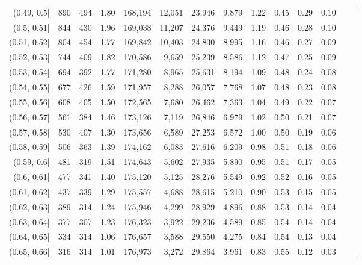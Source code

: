 \begin{tabular}{rrrrrrrrrrrrrr}
(0.49, 0.5]    &    890 &  494 &    1.80 &  168,194 &   12,051 &  23,946 &   9,879 &  1.22 &  0.45 &  0.29 &      0.10 \\
(0.5, 0.51]    &    844 &  430 &    1.96 &  169,038 &   11,207 &  24,376 &   9,449 &  1.19 &  0.46 &  0.28 &      0.10 \\
(0.51, 0.52]   &    804 &  454 &    1.77 &  169,842 &   10,403 &  24,830 &   8,995 &  1.16 &  0.46 &  0.27 &      0.09 \\
(0.52, 0.53]   &    744 &  409 &    1.82 &  170,586 &    9,659 &  25,239 &   8,586 &  1.12 &  0.47 &  0.25 &      0.09 \\
(0.53, 0.54]   &    694 &  392 &    1.77 &  171,280 &    8,965 &  25,631 &   8,194 &  1.09 &  0.48 &  0.24 &      0.08 \\
(0.54, 0.55]   &    677 &  426 &    1.59 &  171,957 &    8,288 &  26,057 &   7,768 &  1.07 &  0.48 &  0.23 &      0.08 \\
(0.55, 0.56]   &    608 &  405 &    1.50 &  172,565 &    7,680 &  26,462 &   7,363 &  1.04 &  0.49 &  0.22 &      0.07 \\
(0.56, 0.57]   &    561 &  384 &    1.46 &  173,126 &    7,119 &  26,846 &   6,979 &  1.02 &  0.50 &  0.21 &      0.07 \\
(0.57, 0.58]   &    530 &  407 &    1.30 &  173,656 &    6,589 &  27,253 &   6,572 &  1.00 &  0.50 &  0.19 &      0.06 \\
(0.58, 0.59]   &    506 &  363 &    1.39 &  174,162 &    6,083 &  27,616 &   6,209 &  0.98 &  0.51 &  0.18 &      0.06 \\
(0.59, 0.6]    &    481 &  319 &    1.51 &  174,643 &    5,602 &  27,935 &   5,890 &  0.95 &  0.51 &  0.17 &      0.05 \\
(0.6, 0.61]    &    477 &  341 &    1.40 &  175,120 &    5,125 &  28,276 &   5,549 &  0.92 &  0.52 &  0.16 &      0.05 \\
(0.61, 0.62]   &    437 &  339 &    1.29 &  175,557 &    4,688 &  28,615 &   5,210 &  0.90 &  0.53 &  0.15 &      0.05 \\
(0.62, 0.63]   &    389 &  314 &    1.24 &  175,946 &    4,299 &  28,929 &   4,896 &  0.88 &  0.53 &  0.14 &      0.04 \\
(0.63, 0.64]   &    377 &  307 &    1.23 &  176,323 &    3,922 &  29,236 &   4,589 &  0.85 &  0.54 &  0.14 &      0.04 \\
(0.64, 0.65]   &    334 &  314 &    1.06 &  176,657 &    3,588 &  29,550 &   4,275 &  0.84 &  0.54 &  0.13 &      0.04 \\
(0.65, 0.66]   &    316 &  314 &    1.01 &  176,973 &    3,272 &  29,864 &   3,961 &  0.83 &  0.55 &  0.12 &      0.03 \\

\end{tabular}
